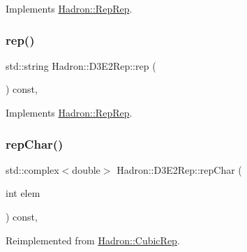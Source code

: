 Implements \mbox{\hyperlink{structHadron_1_1RepRep_ab3213025f6de249f7095892109575fde}{Hadron\+::\+Rep\+Rep}}.

\mbox{\label{structHadron_1_1D3E2Rep_a364e5dfff2bff7d5c2cfce7811e2fe9f}} 
\subsubsection{\texorpdfstring{rep()}{rep()}\hspace{0.1cm}{\footnotesize\ttfamily [3/3]}}
{\footnotesize\ttfamily std\+::string Hadron\+::\+D3\+E2\+Rep\+::rep (\begin{DoxyParamCaption}{ }\end{DoxyParamCaption}) const\hspace{0.3cm}{\ttfamily [inline]}, {\ttfamily [virtual]}}



Implements \mbox{\hyperlink{structHadron_1_1RepRep_ab3213025f6de249f7095892109575fde}{Hadron\+::\+Rep\+Rep}}.

\mbox{\label{structHadron_1_1D3E2Rep_a42a47ca21cfc9fe3d79daa1a5b697a2b}} 
\subsubsection{\texorpdfstring{repChar()}{repChar()}\hspace{0.1cm}{\footnotesize\ttfamily [1/2]}}
{\footnotesize\ttfamily std\+::complex$<$double$>$ Hadron\+::\+D3\+E2\+Rep\+::rep\+Char (\begin{DoxyParamCaption}\item[{int}]{elem }\end{DoxyParamCaption}) const\hspace{0.3cm}{\ttfamily [inline]}, {\ttfamily [virtual]}}



Reimplemented from \mbox{\hyperlink{structHadron_1_1CubicRep_af45227106e8e715e84b0af69cd3b36f8}{Hadron\+::\+Cubic\+Rep}}.

